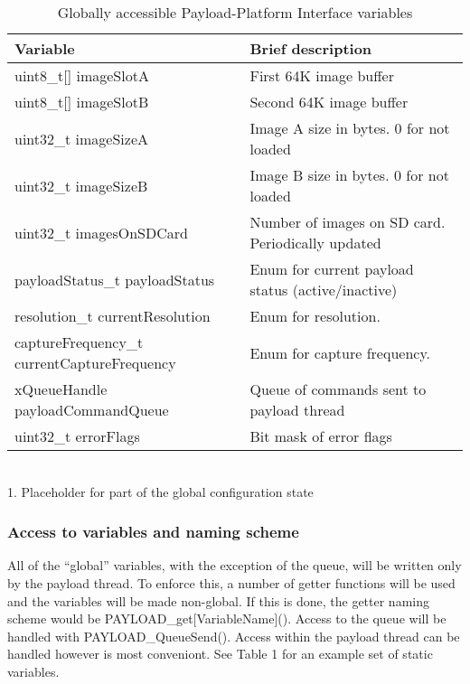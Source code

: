 \documentclass{article}
\begin{document}
\begin{table}
\begin{center}
\caption{Globally accessible Payload-Platform Interface variables}
\begin{tabular}{| l | l |}
    \hline 
    Variable & Brief description \\ \hline
    uint8\_t[] imageSlotA & First 64K image buffer \\ \hline
    uint8\_t[] imageSlotB & Second 64K image buffer \\ \hline
    uint32\_t imageSizeA & Image A size in bytes. 0 for not loaded\\ \hline
    uint32\_t imageSizeB & Image B size in bytes. 0 for not loaded \\ \hline
    uint32\_t imagesOnSDCard & Number of images on SD card. Periodically updated \\ \hline
    payloadStatus\_t payloadStatus & Enum for current payload status (active/inactive) \\ \hline
    resolution\_t currentResolution\footnotemark[1] & Enum 
    for resolution. \\ \hline
    captureFrequency\_t currentCaptureFrequency\footnotemark[1] & Enum 
    for capture frequency. \\ \hline
    xQueueHandle payloadCommandQueue & Queue of commands sent to payload thread \\ \hline
    uint32\_t errorFlags & Bit mask of error flags \\ \hline
\end{tabular}\\
\footnotesize{1. Placeholder for part of the global configuration state} 
\end{center}
\end{table}

\subsubsection{Access to variables and naming scheme}
All of the ``global'' variables, with the exception of the queue,
will be written only by the payload thread. To enforce
this, a number of getter functions will be used and the variables will be made non-global.
If this is done, the getter naming scheme would be PAYLOAD\_get[VariableName](). Access to the
queue will be handled with PAYLOAD\_QueueSend(). Access within the payload thread
can be handled however is most conveniont. See Table 1 for an example set of
static variables.
\end{document}
